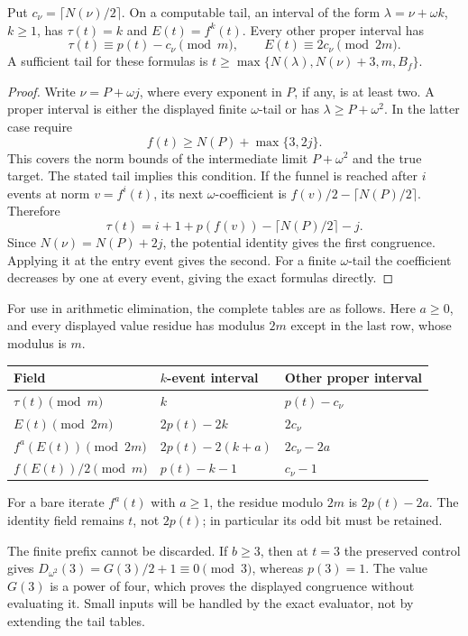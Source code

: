 \begin{proposition}\label{prop:entry-residues}
Put \(c_\nu=\lceil N(\nu)/2\rceil\).  On a computable tail,
an interval of the form \(\lambda=\nu+\omega k\), \(k\ge1\),
has \(\tau(t)=k\) and \(E(t)=f^k(t)\).  Every other proper interval
has
\begin{equation}\label{eq:long-entry-residues}
 \tau(t)\equiv p(t)-c_\nu\pmod m,\qquad
 E(t)\equiv2c_\nu\pmod{2m}.
\end{equation}
A sufficient tail for these formulas is
\(t\ge\max\{N(\lambda),N(\nu)+3,m,B_f\}\).
\end{proposition}
\begin{proof}
Write \(\nu=P+\omega j\), where every exponent in \(P\), if any,
is at least two.  A proper interval is either the displayed finite
\(\omega\)-tail or has \(\lambda\ge P+\omega^2\).
In the latter case require
\[
 f(t)\ge N(P)+\max\{3,2j\}.
\]
This covers the norm bounds of the intermediate limit \(P+\omega^2\)
and the true target.
The stated tail implies this condition.  If the funnel is reached after
\(i\) events at norm \(v=f^i(t)\), its next \(\omega\)-coefficient
is \(f(v)/2-\lceil N(P)/2\rceil\).  Therefore
\[
 \tau(t)=i+1+p(f(v))-\lceil N(P)/2\rceil-j.
\]
Since \(N(\nu)=N(P)+2j\), the potential identity gives the first
congruence.  Applying it at the entry event gives the second.
For a finite \(\omega\)-tail the coefficient decreases by one at every
event, giving the exact formulas directly.
\end{proof}

For use in arithmetic elimination, the complete tables are as follows.
Here \(a\ge0\), and every displayed value residue has modulus \(2m\)
except in the last row, whose modulus is \(m\).
\begin{center}\small
\begin{tabular}{@{}lll@{}}\toprule
Field & \(k\)-event interval & Other proper interval\\\midrule
\(\tau(t)\pmod m\) & \(k\) & \(p(t)-c_\nu\)\\
\(E(t)\pmod{2m}\) & \(2p(t)-2k\) & \(2c_\nu\)\\
\(f^a(E(t))\pmod{2m}\) & \(2p(t)-2(k+a)\) & \(2c_\nu-2a\)\\
\(f(E(t))/2\pmod m\) & \(p(t)-k-1\) & \(c_\nu-1\)\\\bottomrule
\end{tabular}
\end{center}
For a bare iterate \(f^a(t)\) with \(a\ge1\), the residue modulo
\(2m\) is \(2p(t)-2a\).  The identity field remains \(t\), not
\(2p(t)\); in particular its odd bit must be retained.

The finite prefix cannot be discarded.  If \(b\ge3\), then at
\(t=3\) the preserved control gives
\(D_{\omega^2}(3)=G(3)/2+1\equiv0\pmod3\), whereas
\(p(3)=1\).  The value \(G(3)\) is a power of four, which proves
the displayed congruence without evaluating it.  Small inputs will be
handled by the exact evaluator, not by extending the tail tables.
